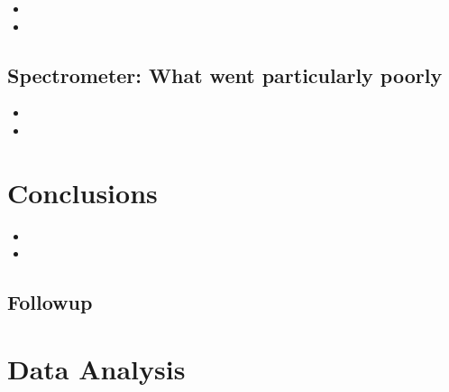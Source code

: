 \begin{itemize}
\item{}
\item{}
\end{itemize}

\subsection{Spectrometer: {\color{red} What went particularly poorly}}

\begin{itemize}
\item{}
\item{}
\end{itemize}


\section{Conclusions}

\begin{itemize}
\item{}
\item{}
\end{itemize}


\subsection{Followup}


\begin{enumerate}
\enumerate{}
\end{enumerate}

\newpage

\section{Data Analysis}

